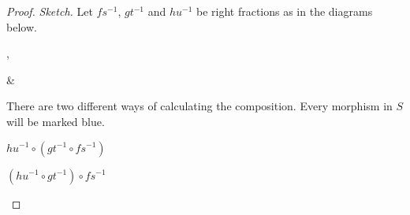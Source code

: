     \begin{proof}\emph{Sketch.}
        Let $fs^{-1}$, $gt^{-1}$ and $hu^{-1}$ be right fractions as in the diagrams below.
        \begin{center}
            ,
            \&
        \end{center}
        There are two different ways of calculating the composition. Every morphism in $S$ will be marked blue.
        \begin{center}
            \begin{minipage}[c]{0.4\textwidth}
                \underline{$hu^{-1}\circ (gt^{-1}\circ fs^{-1})$}\\
            \end{minipage}
            \begin{minipage}[c]{0.4\textwidth}
                \underline{$(hu^{-1}\circ gt^{-1})\circ fs^{-1}$}\\
            \end{minipage}
        \end{center}

\end{proof}
